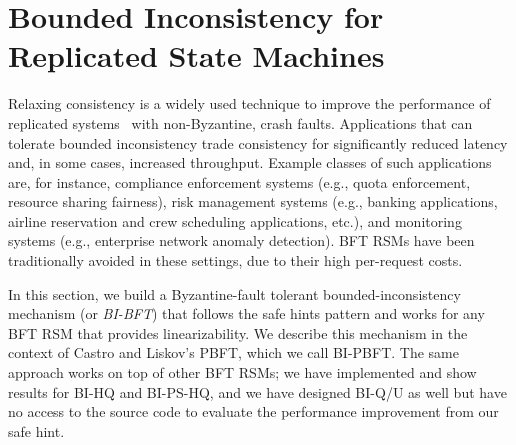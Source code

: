 \documentclass[twocolumn,10pt]{article}
\begin{document}
\fi













































\section{Bounded Inconsistency for Replicated State Machines}
\label{sec:boundedInconsistency}

Relaxing consistency is a widely used technique to improve the
performance of replicated
systems~\cite{Satyanarayanan2002,Terry1995,Yu2002} with non-Byzantine,
crash faults.  Applications that can tolerate bounded inconsistency 
trade consistency for significantly reduced latency and, in some cases, increased throughput. Example
classes of such applications are, for instance, compliance enforcement
systems (e.g., quota enforcement, resource sharing fairness), risk
management systems (e.g., banking applications, airline reservation and
crew scheduling applications, etc.), and monitoring systems (e.g.,
enterprise network anomaly detection).  BFT RSMs have been traditionally
avoided in these settings, due to their high per-request costs.

In this section, we build a Byzantine-fault
tolerant bounded-inconsistency mechanism  (or \emph{BI-BFT}) that follows the safe hints
pattern and works for any BFT RSM that provides linearizability.  We
describe this mechanism in the context of Castro and Liskov's PBFT,
which we call BI-PBFT.  The same approach works on top of other BFT
RSMs; we have implemented and show results for BI-HQ and BI-PS-HQ, and
we have designed BI-Q/U as well but have no access to the source code to
evaluate the performance improvement from our safe hint.
\end{document}
